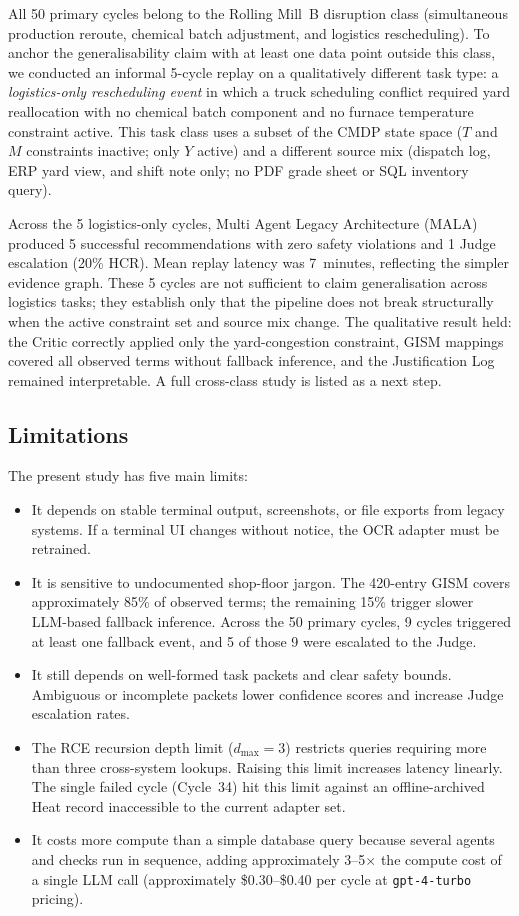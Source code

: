 \documentclass[conference]{IEEEtran}
\newcommand{\MALA}{Multi Agent Legacy Architecture (MALA)}
\begin{document}
All 50 primary cycles belong to the Rolling Mill~B disruption class (simultaneous production reroute, chemical batch adjustment, and logistics rescheduling). To anchor the generalisability claim with at least one data point outside this class, we conducted an informal 5-cycle replay on a qualitatively different task type: a \emph{logistics-only rescheduling event} in which a truck scheduling conflict required yard reallocation with no chemical batch component and no furnace temperature constraint active. This task class uses a subset of the CMDP state space ($T$ and $M$ constraints inactive; only $Y$ active) and a different source mix (dispatch log, ERP yard view, and shift note only; no PDF grade sheet or SQL inventory query).

Across the 5 logistics-only cycles, \MALA{} produced 5 successful recommendations with zero safety violations and 1 Judge escalation (20\% HCR). Mean replay latency was 7~minutes, reflecting the simpler evidence graph. These 5 cycles are not sufficient to claim generalisation across logistics tasks; they establish only that the pipeline does not break structurally when the active constraint set and source mix change. The qualitative result held: the Critic correctly applied only the yard-congestion constraint, GISM mappings covered all observed terms without fallback inference, and the Justification Log remained interpretable. A full cross-class study is listed as a next step.

\subsection*{Limitations}
The present study has five main limits:
\begin{itemize}
  \item It depends on stable terminal output, screenshots, or file exports from legacy systems. If a terminal UI changes without notice, the OCR adapter must be retrained.
  \item It is sensitive to undocumented shop-floor jargon. The 420-entry GISM covers approximately 85\% of observed terms; the remaining 15\% trigger slower LLM-based fallback inference. Across the 50 primary cycles, 9 cycles triggered at least one fallback event, and 5 of those 9 were escalated to the Judge.
  \item It still depends on well-formed task packets and clear safety bounds. Ambiguous or incomplete packets lower confidence scores and increase Judge escalation rates.
  \item The RCE recursion depth limit ($d_{\max}=3$) restricts queries requiring more than three cross-system lookups. Raising this limit increases latency linearly. The single failed cycle (Cycle~34) hit this limit against an offline-archived Heat record inaccessible to the current adapter set.
  \item It costs more compute than a simple database query because several agents and checks run in sequence, adding approximately 3--5$\times$ the compute cost of a single LLM call (approximately \$0.30--\$0.40 per cycle at \texttt{gpt-4-turbo} pricing).
\end{itemize}
\end{document}
